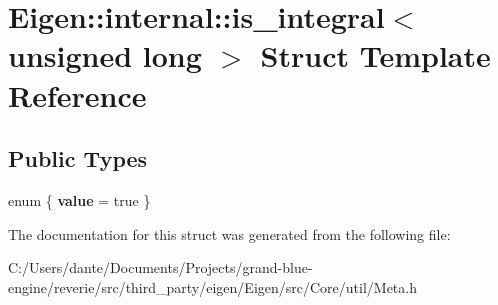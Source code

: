 \hypertarget{struct_eigen_1_1internal_1_1is__integral_3_01unsigned_01long_01_4}{}\section{Eigen\+::internal\+::is\+\_\+integral$<$ unsigned long $>$ Struct Template Reference}
\label{struct_eigen_1_1internal_1_1is__integral_3_01unsigned_01long_01_4}
\subsection*{Public Types}
\begin{DoxyCompactItemize}
\item 
\mbox{\label{struct_eigen_1_1internal_1_1is__integral_3_01unsigned_01long_01_4_a5ffd61840553315007e4d448e5ee52bd}} 
enum \{ {\bfseries value} = true
 \}
\end{DoxyCompactItemize}


The documentation for this struct was generated from the following file\+:\begin{DoxyCompactItemize}
\item 
C\+:/\+Users/dante/\+Documents/\+Projects/grand-\/blue-\/engine/reverie/src/third\+\_\+party/eigen/\+Eigen/src/\+Core/util/Meta.\+h\end{DoxyCompactItemize}
